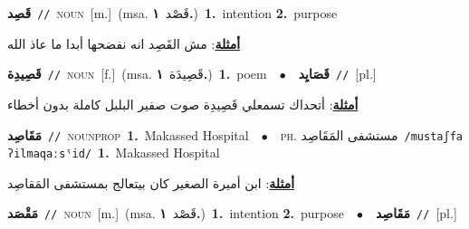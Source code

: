 \documentclass[10pt,a4paper,twoside]{article} %
\begin{document}
\begin{multicols}{2}
{\setlength\topsep{0pt}\textbf{\foreignlanguage{arabic}{قَصِد}}\ {\color{gray}\texttt{//}\color{black}}\ \textsc{noun}\ [m.]\ \color{gray}(msa. \foreignlanguage{arabic}{قَصْد}~\foreignlanguage{arabic}{\textbf{١.}})\color{black}\ \textbf{1.}~intention  \textbf{2.}~purpose\  \begin{flushright}\color{gray}\foreignlanguage{arabic}{\textbf{\underline{\foreignlanguage{arabic}{أمثلة}}}: مش القَصِد انه نفضحها أبدا ما عاذ الله}\end{flushright}\color{black}} \vspace{2mm}

{\setlength\topsep{0pt}\textbf{\foreignlanguage{arabic}{قَصِيدِة}}\ {\color{gray}\texttt{//}\color{black}}\ \textsc{noun}\ [f.]\ \color{gray}(msa. \foreignlanguage{arabic}{قَصِيدَة}~\foreignlanguage{arabic}{\textbf{١.}})\color{black}\ \textbf{1.}~poem\ \ $\bullet$\ \ \setlength\topsep{0pt}\textbf{\foreignlanguage{arabic}{قَصَايِد}}\ {\color{gray}\texttt{//}\color{black}}\ [pl.]\  \begin{flushright}\color{gray}\foreignlanguage{arabic}{\textbf{\underline{\foreignlanguage{arabic}{أمثلة}}}: أتحداك تسمعلي قَصِيدِة صوت صفير البلبل كاملة بدون أخطاء}\end{flushright}\color{black}} \vspace{2mm}

{\setlength\topsep{0pt}\textbf{\foreignlanguage{arabic}{مَقَاصِد}}\ {\color{gray}\texttt{//}\color{black}}\ \textsc{noun\textunderscore prop}\ \textbf{1.}~Makassed Hospital\ \ $\bullet$\ \ \textsc{ph.} \color{gray} \foreignlanguage{arabic}{مستشفى المَقَاصِد}\color{black}\ {\color{gray}\texttt{/{\sffamily mustaʃfa ʔilmaqaːsˤid}/}\color{black}}\ \textbf{1.}~Makassed Hospital\  \begin{flushright}\color{gray}\foreignlanguage{arabic}{\textbf{\underline{\foreignlanguage{arabic}{أمثلة}}}: ابن أميرة الصغير كان بيتعالج بمستشفى المَقاصِد}\end{flushright}\color{black}} \vspace{2mm}

{\setlength\topsep{0pt}\textbf{\foreignlanguage{arabic}{مَقْصَد}}\ {\color{gray}\texttt{//}\color{black}}\ \textsc{noun}\ [m.]\ \color{gray}(msa. \foreignlanguage{arabic}{قَصْد}~\foreignlanguage{arabic}{\textbf{١.}})\color{black}\ \textbf{1.}~intention  \textbf{2.}~purpose\ \ $\bullet$\ \ \setlength\topsep{0pt}\textbf{\foreignlanguage{arabic}{مَقَاصِد}}\ {\color{gray}\texttt{//}\color{black}}\ [pl.]\ } \vspace{2mm}


\end{multicols}
\end{document}
